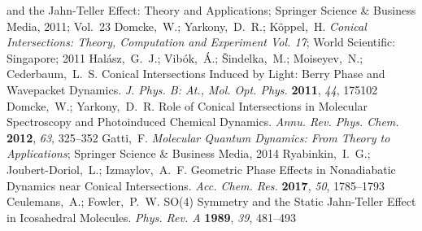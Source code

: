 \documentclass[superscriptaddress,showpacs,amsmath,amssymb,pra,twocolumn]{revtex4-1}
\begin{document}
\begin{thebibliography}{61}
{  and the {{Jahn}}-{{Teller Effect}}: {{Theory}} and {{Applications}}};
  {Springer Science \& Business Media}, 2011; Vol.~23\relax
\mciteBstWouldAddEndPuncttrue
\mciteSetBstMidEndSepPunct{\mcitedefaultmidpunct}
{\mcitedefaultendpunct}{\mcitedefaultseppunct}\relax
\EndOfBibitem
{}
Domcke,~W.; Yarkony,~D.~R.; K{\"o}ppel,~H. \emph{Conical Intersections: Theory,
  Computation and Experiment Vol. 17};  {World Scientific: Singapore}; 2011 \relax
\mciteBstWouldAddEndPuncttrue
\mciteSetBstMidEndSepPunct{\mcitedefaultmidpunct}
{\mcitedefaultendpunct}{\mcitedefaultseppunct}\relax
\EndOfBibitem
{}
Hal\'{a}sz,~G.~J.; Vib\'{o}k,~\'{A}.; \v{S}indelka,~M.; Moiseyev,~N.; Cederbaum,~L.~S.
  Conical Intersections Induced by Light: {{Berry}} Phase and Wavepacket
  Dynamics. \emph{J. Phys. B: At., Mol. Opt. Phys.}
  \textbf{2011}, \emph{44}, 175102\relax
\mciteBstWouldAddEndPuncttrue
\mciteSetBstMidEndSepPunct{\mcitedefaultmidpunct}
{\mcitedefaultendpunct}{\mcitedefaultseppunct}\relax
\EndOfBibitem
{}
Domcke,~W.; Yarkony,~D.~R. Role of {{Conical Intersections}} in {{Molecular
  Spectroscopy}} and {{Photoinduced Chemical Dynamics}}. \emph{Annu. Rev.
  Phys. Chem.} \textbf{2012}, \emph{63}, 325--352\relax
\mciteBstWouldAddEndPuncttrue
\mciteSetBstMidEndSepPunct{\mcitedefaultmidpunct}
{\mcitedefaultendpunct}{\mcitedefaultseppunct}\relax
\EndOfBibitem
{}
Gatti,~F. \emph{Molecular Quantum Dynamics: From Theory to Applications};
  {Springer Science \& Business Media}, 2014\relax
\mciteBstWouldAddEndPuncttrue
\mciteSetBstMidEndSepPunct{\mcitedefaultmidpunct}
{\mcitedefaultendpunct}{\mcitedefaultseppunct}\relax
\EndOfBibitem
{}
Ryabinkin,~I.~G.; Joubert-Doriol,~L.; Izmaylov,~A.~F. Geometric {{Phase
  Effects}} in {{Nonadiabatic Dynamics}} near {{Conical Intersections}}.
  \emph{Acc. Chem. Res.} \textbf{2017}, \emph{50},
  1785--1793\relax
\mciteBstWouldAddEndPuncttrue
\mciteSetBstMidEndSepPunct{\mcitedefaultmidpunct}
{\mcitedefaultendpunct}{\mcitedefaultseppunct}\relax
\EndOfBibitem
{}
Ceulemans,~A.; Fowler,~P.~W. {{SO}}(4) Symmetry and the Static
  {{Jahn}}-{{Teller}} Effect in Icosahedral Molecules. \emph{Phys. Rev. A}
  \textbf{1989}, \emph{39}, 481--493\relax

\end{thebibliography}
\end{document}
